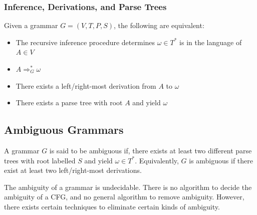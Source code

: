 \subsubsection{Inference, Derivations, and Parse Trees}
Given a grammar $G=(V,T,P,S)$, the following are equivalent:
 \begin{itemize}
  \item The recursive inference procedure determines $\omega\in T^{*}$ is in the language of
     $A\in V$
   \item $A \Rightarrow _G^{*}\omega$
   \item There exists a left/right-most derivation from $A$ to $\omega$
   \item There exists a parse tree with root $A$ and yield $\omega$
\end{itemize}

\subsection{Ambiguous Grammars}
\begin{definition}
  A grammar $G$ is said to be ambiguous if, there exists at least two different
  parse trees with root labelled $S$ and yield $\omega\in T^{*}$.
  Equivalently, $G$ is ambiguous if there exist at least two left/right-most
  derivations.
\end{definition}

\begin{remark}
  The ambiguity of a grammar is undecidable.  There is no algorithm to decide
  the ambiguity of a CFG, and no general algorithm to remove ambiguity.
  However, there exists certain techniques to eliminate certain kinds of
  ambiguity.
\end{remark}

